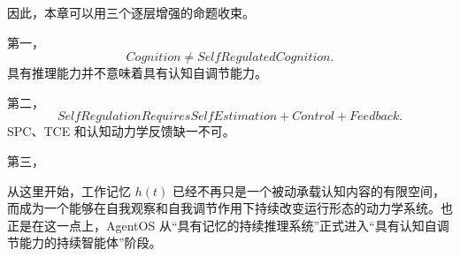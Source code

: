 因此，本章可以用三个逐层增强的命题收束。

第一，
\begin{equation}
\boxed{
Cognition
\neq
SelfRegulatedCognition.
}
\end{equation}
具有推理能力并不意味着具有认知自调节能力。

第二，
\begin{equation}
\boxed{
SelfRegulation
Requires
SelfEstimation
+
Control
+
Feedback.
}
\end{equation}
SPC、TCE 和认知动力学反馈缺一不可。

第三，
\begin{statementbox}
\centering
{}
\end{statementbox}

从这里开始，工作记忆 $h(t)$ 已经不再只是一个被动承载认知内容的有限空间，而成为一个能够在自我观察和自我调节作用下持续改变运行形态的动力学系统。也正是在这一点上，AgentOS 从``具有记忆的持续推理系统''正式进入``具有认知自调节能力的持续智能体''阶段。
